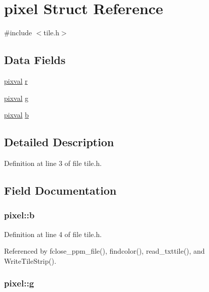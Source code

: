\hypertarget{structpixel}{\section{pixel Struct Reference}
\label{structpixel}
}


{\ttfamily \#include $<$tile.\+h$>$}

\subsection*{Data Fields}
\begin{DoxyCompactItemize}
\item 
\hyperlink{tile_8h_aa6367451fcfe2de81dffaeb485b7a59c}{pixval} \hyperlink{structpixel_aa54a32268c2ddf156577cfc79a858d58}{r}
\item 
\hyperlink{tile_8h_aa6367451fcfe2de81dffaeb485b7a59c}{pixval} \hyperlink{structpixel_ade1a7e5fcb9d3e9756669a559f654958}{g}
\item 
\hyperlink{tile_8h_aa6367451fcfe2de81dffaeb485b7a59c}{pixval} \hyperlink{structpixel_ae12c7adf966c6aa301af45c395925d05}{b}
\end{DoxyCompactItemize}


\subsection{Detailed Description}


Definition at line 3 of file tile.\+h.



\subsection{Field Documentation}
\hypertarget{structpixel_ae12c7adf966c6aa301af45c395925d05}{
\subsubsection[{b}]{ pixel\+::b}}\label{structpixel_ae12c7adf966c6aa301af45c395925d05}


Definition at line 4 of file tile.\+h.



Referenced by fclose\+\_\+ppm\+\_\+file(), findcolor(), read\+\_\+txttile(), and Write\+Tile\+Strip().

\hypertarget{structpixel_ade1a7e5fcb9d3e9756669a559f654958}{
\subsubsection[{g}]{ pixel\+::g}}\label{structpixel_ade1a7e5fcb9d3e9756669a559f654958}


